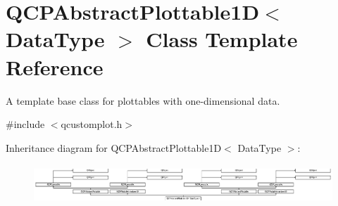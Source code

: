 \hypertarget{class_q_c_p_abstract_plottable1_d}{}\section{Q\+C\+P\+Abstract\+Plottable1D$<$ Data\+Type $>$ Class Template Reference}
\label{class_q_c_p_abstract_plottable1_d}


A template base class for plottables with one-\/dimensional data.  




{\ttfamily \#include $<$qcustomplot.\+h$>$}

Inheritance diagram for Q\+C\+P\+Abstract\+Plottable1D$<$ Data\+Type $>$\+:\begin{figure}[H]
\begin{center}
\leavevmode
\includegraphics[height=1.483051cm]{class_q_c_p_abstract_plottable1_d}
\end{center}
\end{figure}
